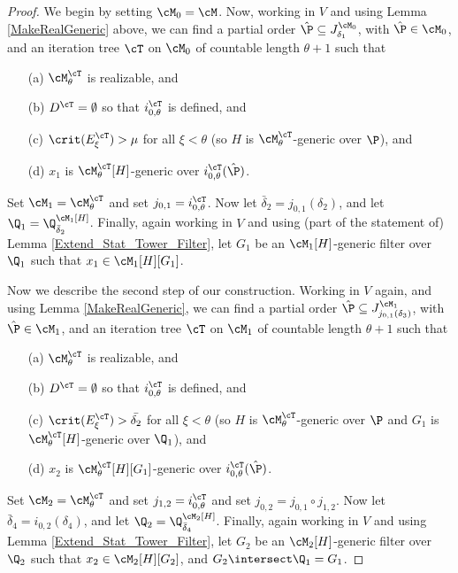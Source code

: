 \begin{proof}
We begin by setting $\cM_0=\cM$. Now, working  in $V$ and
using Lemma \ref{MakeRealGeneric} above, we can find a partial order
$\hat{\P}\subseteq J^{\cM_0}_{\delta_1}$, with $\hat{\P}\in \cM_0$, and an
iteration tree $\cT$ on $\cM_0$ of countable length $\theta+1$ such that
\begin{itemize}
\item[(a)] $\cM^{\cT}_{\theta}$ is realizable, and
\item[(b)] $D^{\cT}=\emptyset$ so that $i^{\cT}_{0,\theta}$ is defined,
and
\item[(c)] $\crit(E^{\cT}_{\xi}) > \mu$ for all $\xi<\theta$
(so $H$ is $\cM^{\cT}_{\theta}$-generic over $\P$), and
\item[(d)] $x_1$ is $\cM^{\cT}_{\theta}[H]$-generic over
$i^{\cT}_{0,\theta}(\hat{\P})$.
\end{itemize}
Set $\cM_1=\cM^{\cT}_{\theta}$ and set $j_{0,1}=i^{\cT}_{0,\theta}$. Now
let $\bar{\delta}_2=j_{0,1}(\delta_2)$, and let
$\Q_1=\Q_{\bar{\delta}_2}^{\cM_1[H]}$.
Finally, again working in $V$ and using (part of the statement of)
Lemma \ref{Extend_Stat_Tower_Filter}, let $G_1$ be an $\cM_1[H]$-generic
filter over $\Q_1$ such that $x_1\in\cM_1[H][G_1]$.

Now we describe the second step of our construction. Working in $V$ again,
and using  Lemma \ref{MakeRealGeneric}, we can find a partial order
$\hat{\P}\subseteq J^{\cM_1}_{j_{0,1}(\delta_3)}$, with $\hat{\P}\in
\cM_1$, and an iteration tree $\cT$ on $\cM_1$ of countable length
$\theta+1$ such that
\begin{itemize}
\item[(a)] $\cM^{\cT}_{\theta}$ is realizable, and
\item[(b)] $D^{\cT}=\emptyset$ so that $i^{\cT}_{0,\theta}$ is defined,
and
\item[(c)] $\crit(E^{\cT}_{\xi}) > \bar{\delta_2}$ for all $\xi<\theta$
(so $H$ is $\cM^{\cT}_{\theta}$-generic over $\P$ and $G_1$ is
$\cM^{\cT}_{\theta}[H]$-generic over $\Q_1$), and
\item[(d)] $x_2$ is $\cM^{\cT}_{\theta}[H][G_1]$-generic over
$i^{\cT}_{0,\theta}(\hat{\P})$.
\end{itemize}
 Set $\cM_2=\cM^{\cT}_{\theta}$ and set
$j_{1,2}=i^{\cT}_{0,\theta}$ and set $j_{0,2}=j_{0,1}\circ j_{1,2}$. Now
let $\bar{\delta}_4=i_{0,2}(\delta_4)$, and let
$\Q_2=\Q_{\bar{\delta}_4}^{\cM_2[H]}$.
Finally, again working in $V$ and using
Lemma \ref{Extend_Stat_Tower_Filter}, let $G_2$ be an $\cM_2[H]$-generic
filter over $\Q_2$ such that $x_2\in\cM_2[H][G_2]$, and
$G_2\intersect\Q_1=G_1$.


\end{proof}

